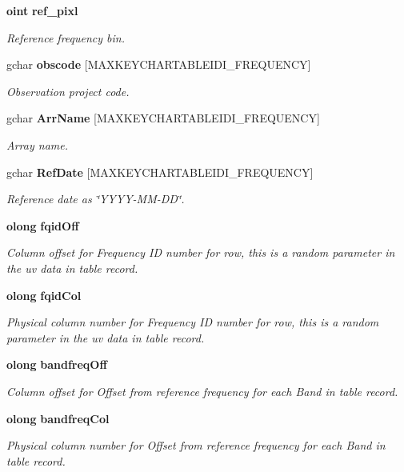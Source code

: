 \begin{CompactItemize}
{\bf oint} {\bf ref\_\-pixl}
\begin{CompactList}\small\item\em Reference frequency bin. \item\end{CompactList}\item 
gchar {\bf obscode} [MAXKEYCHARTABLEIDI\_\-FREQUENCY]
\begin{CompactList}\small\item\em Observation project code. \item\end{CompactList}\item 
gchar {\bf Arr\-Name} [MAXKEYCHARTABLEIDI\_\-FREQUENCY]
\begin{CompactList}\small\item\em Array name. \item\end{CompactList}\item 
gchar {\bf Ref\-Date} [MAXKEYCHARTABLEIDI\_\-FREQUENCY]
\begin{CompactList}\small\item\em Reference date as \char`\"{}YYYY-MM-DD\char`\"{}. \item\end{CompactList}\item 
{\bf olong} {\bf fqid\-Off}
\begin{CompactList}\small\item\em Column offset for Frequency ID number for row, this is a random parameter in the uv data in table record. \item\end{CompactList}\item 
{\bf olong} {\bf fqid\-Col}
\begin{CompactList}\small\item\em Physical column number for Frequency ID number for row, this is a random parameter in the uv data in table record. \item\end{CompactList}\item 
{\bf olong} {\bf bandfreq\-Off}
\begin{CompactList}\small\item\em Column offset for Offset from reference frequency for each Band in table record. \item\end{CompactList}\item 
{\bf olong} {\bf bandfreq\-Col}
\begin{CompactList}\small\item\em Physical column number for Offset from reference frequency for each Band in table record. \item\end{CompactList}\item 

\end{CompactItemize}
